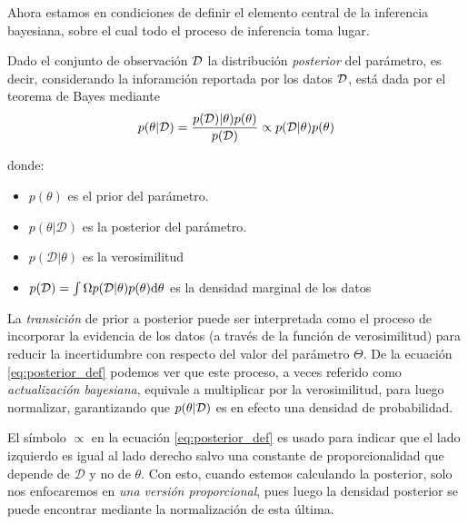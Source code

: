 Ahora estamos en condiciones de definir el elemento central de la inferencia bayesiana, sobre el cual todo el proceso de inferencia toma lugar. 

\begin{definition}
\label{dist_posterior}
Dado el conjunto de observación ${\mathcal D}$ la distribución \emph{posterior} del parámetro, es decir, considerando la inforamción reportada por los datos ${\mathcal D}$, está dada por el teorema de Bayes mediante
\begin{align}
    p(\theta|{\mathcal D}) = \frac{p({\mathcal D})|\theta)p(\theta)}{p({\mathcal D})}  \propto p(\mathcal{D}|\theta) p(\theta) \label{eq:posterior_def}
\end{align}

donde: 
\begin{itemize}
    \item $p(\theta)$ es el prior del parámetro.
    \item $p(\theta|\mathcal{D})$ es la posterior del parámetro. 
    \item $p(\mathcal{D}|\theta)$ es la verosimilitud
    \item $p(\mathcal{D}) = \int\Omega p(\mathcal{D}|\theta)p(\theta){\text{d}} \theta $ es la densidad marginal de los datos 
\end{itemize}
\end{definition}

La \emph{transición} de prior a posterior puede ser interpretada como el proceso de incorporar la evidencia de los datos (a través de la función de verosimilitud) para reducir la incertidumbre con respecto del valor del parámetro $\Theta$. De la ecuación \eqref{eq:posterior_def} podemos ver que este proceso, a veces referido como \emph{actualización bayesiana}, equivale a multiplicar por la verosimilitud, para luego normalizar, garantizando que $p(\theta|{\mathcal D})$ es en efecto una densidad de probabilidad. 

\begin{remark}
El símbolo $\propto$ en la ecuación \eqref{eq:posterior_def} es usado para indicar que el lado izquierdo es igual al lado derecho salvo una constante de proporcionalidad que depende de $\mathcal{D}$ y no de $\theta$. Con esto, cuando estemos calculando la posterior, solo nos enfocaremos en \emph{una versión proporcional}, pues luego la densidad posterior se puede encontrar mediante la normalización de esta última.
\end{remark}

